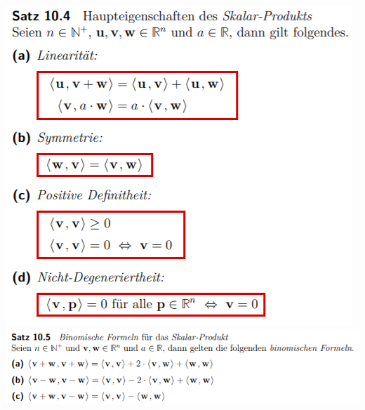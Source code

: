 \includegraphics[width=\columnwidth]{./images/vek10.png}
\includegraphics[width=\columnwidth]{./images/vek11.png}
